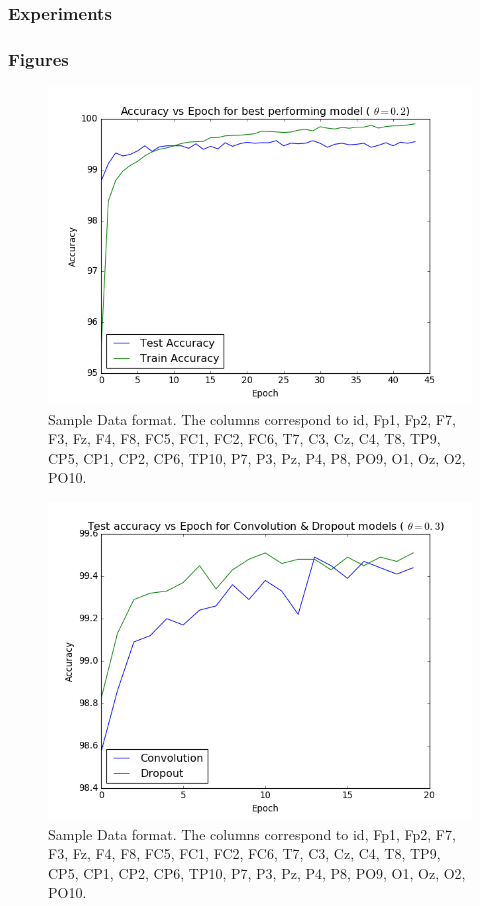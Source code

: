 \documentclass{article}
\begin{document}
\subsubsection{Experiments}
\subsubsection{Figures}
\begin{figure}[ht!]
  \centering
  \includegraphics[width=1\textwidth]{bestPerformance}
  \caption{Sample Data format.  The columns correspond to id,  Fp1, Fp2, F7, F3, Fz, F4, F8, FC5, FC1, FC2, FC6, T7, C3, Cz, C4, T8, TP9, CP5, CP1, CP2, CP6, TP10, P7, P3, Pz, P4, P8, PO9, O1, Oz, O2, PO10.\label{fig:Sample_data}}
\end{figure}
\begin{figure}[ht!]
  \centering
  \includegraphics[width=1\textwidth]{convolution_dropout}
  \caption{Sample Data format.  The columns correspond to id,  Fp1, Fp2, F7, F3, Fz, F4, F8, FC5, FC1, FC2, FC6, T7, C3, Cz, C4, T8, TP9, CP5, CP1, CP2, CP6, TP10, P7, P3, Pz, P4, P8, PO9, O1, Oz, O2, PO10.\label{fig:Sample_data}}
\end{figure}
\end{document}
